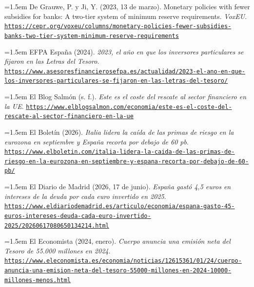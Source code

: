 \documentclass[10pt,a4paper]{article}
\begin{document}
\noindent\hangindent=1.5em De Grauwe, P. y Ji, Y. (2023, 13 de marzo). Monetary policies with fewer subsidies for banks: A two-tier system of minimum reserve requirements. \textit{VoxEU}. \href{https://cepr.org/voxeu/columns/monetary-policies-fewer-subsidies-banks-two-tier-system-minimum-reserve-requirements}{\nolinkurl{https://cepr.org/voxeu/columns/monetary-policies-fewer-subsidies-banks-two-tier-system-minimum-reserve-requirements}}

\noindent\hangindent=1.5em EFPA España (2024). \textit{2023, el año en que los inversores particulares se fijaron en las Letras del Tesoro}. \href{https://www.asesoresfinancierosefpa.es/actualidad/2023-el-ano-en-que-los-inversores-particulares-se-fijaron-en-las-letras-del-tesoro/}{\nolinkurl{https://www.asesoresfinancierosefpa.es/actualidad/2023-el-ano-en-que-los-inversores-particulares-se-fijaron-en-las-letras-del-tesoro/}}

\noindent\hangindent=1.5em El Blog Salmón (s. f.). \textit{Este es el coste del rescate al sector financiero en la UE}. \href{https://www.elblogsalmon.com/economia/este-es-el-coste-del-rescate-al-sector-financiero-en-la-ue}{\nolinkurl{https://www.elblogsalmon.com/economia/este-es-el-coste-del-rescate-al-sector-financiero-en-la-ue}}

\noindent\hangindent=1.5em El Boletín (2026). \textit{Italia lidera la caída de las primas de riesgo en la eurozona en septiembre y España recorta por debajo de 60 pb}. \href{https://www.elboletin.com/italia-lidera-la-caida-de-las-primas-de-riesgo-en-la-eurozona-en-septiembre-y-espana-recorta-por-debajo-de-60-pb/}{\nolinkurl{https://www.elboletin.com/italia-lidera-la-caida-de-las-primas-de-riesgo-en-la-eurozona-en-septiembre-y-espana-recorta-por-debajo-de-60-pb/}}

\noindent\hangindent=1.5em El Diario de Madrid (2026, 17 de junio). \textit{España gastó 4,5 euros en intereses de la deuda por cada euro invertido en 2025}. \href{https://www.eldiariodemadrid.es/articulo/economia/espana-gasto-45-euros-intereses-deuda-cada-euro-invertido-2025/20260617080650134214.html}{\nolinkurl{https://www.eldiariodemadrid.es/articulo/economia/espana-gasto-45-euros-intereses-deuda-cada-euro-invertido-2025/20260617080650134214.html}}

\noindent\hangindent=1.5em El Economista (2024, enero). \textit{Cuerpo anuncia una emisión neta del Tesoro de 55.000 millones en 2024}. \href{https://www.eleconomista.es/economia/noticias/12615361/01/24/cuerpo-anuncia-una-emision-neta-del-tesoro-55000-millones-en-2024-10000-millones-menos.html}{\nolinkurl{https://www.eleconomista.es/economia/noticias/12615361/01/24/cuerpo-anuncia-una-emision-neta-del-tesoro-55000-millones-en-2024-10000-millones-menos.html}}
\end{document}

